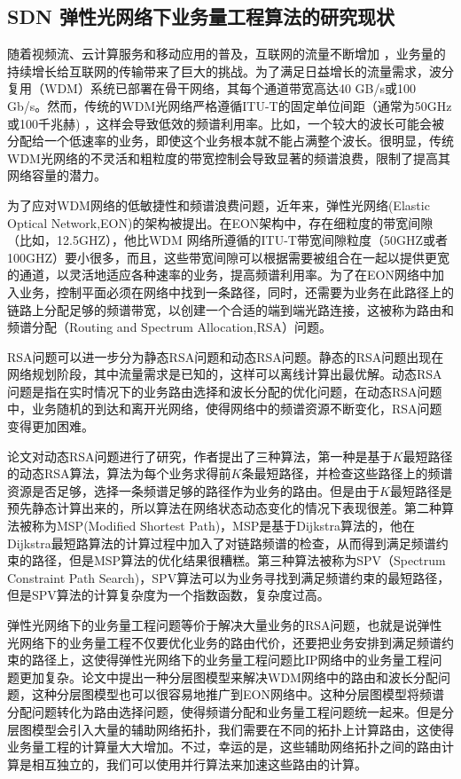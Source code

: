 \documentclass[master]{thesis-uestc}
\begin{document}
\subsection{SDN 弹性光网络下业务量工程算法的研究现状}
随着视频流、云计算服务和移动应用的普及，互联网的流量不断增加 ，业务量的持续增长给互联网的传输带来了巨大的挑战。为了满足日益增长的流量需求，波分复用（WDM）系统已部署在骨干网络，其每个通道带宽高达40 GB/s或100 Gb/s。然而，传统的WDM光网络严格遵循ITU-T的固定单位间距（通常为50GHz或100千兆赫) ，这样会导致低效的频谱利用率。比如，一个较大的波长可能会被分配给一个低速率的业务，即使这个业务根本就不能占满整个波长。很明显，传统WDM光网络的不灵活和粗粒度的带宽控制会导致显著的频谱浪费，限制了提高其网络容量的潜力。

为了应对WDM网络的低敏捷性和频谱浪费问题，近年来，弹性光网络(Elastic Optical Network,EON)的架构被提出。在EON架构中，存在细粒度的带宽间隙（比如，12.5GHZ），他比WDM 网络所遵循的ITU-T带宽间隙粒度（50GHZ或者100GHZ）要小很多，而且，这些带宽间隙可以根据需要被组合在一起以提供更宽的通道，以灵活地适应各种速率的业务，提高频谱利用率。为了在EON网络中加入业务，控制平面必须在网络中找到一条路径，同时，还需要为业务在此路径上的链路上分配足够的频谱带宽，以创建一个合适的端到端光路连接，这被称为路由和频谱分配（Routing and Spectrum Allocation,RSA）问题。

RSA问题可以进一步分为静态RSA问题和动态RSA问题。静态的RSA问题出现在网络规划阶段，其中流量需求是已知的，这样可以离线计算出最优解。动态RSA问题是指在实时情况下的业务路由选择和波长分配的优化问题，在动态RSA问题中，业务随机的到达和离开光网络，使得网络中的频谱资源不断变化，RSA问题变得更加困难。

论文对动态RSA问题进行了研究，作者提出了三种算法，第一种是基于$K$最短路径的动态RSA算法，算法为每个业务求得前$K$条最短路径，并检查这些路径上的频谱资源是否足够，选择一条频谱足够的路径作为业务的路由。但是由于$K$最短路径是预先静态计算出来的，所以算法在网络状态动态变化的情况下表现很差。第二种算法被称为MSP(Modified Shortest Path)，MSP是基于Dijkstra算法的，他在Dijkstra最短路算法的计算过程中加入了对链路频谱的检查，从而得到满足频谱约束的路径，但是MSP算法的优化结果很糟糕。第三种算法被称为SPV（Spectrum Constraint Path Search)，SPV算法可以为业务寻找到满足频谱约束的最短路径，但是SPV算法的计算复杂度为一个指数函数，复杂度过高。

弹性光网络下的业务量工程问题等价于解决大量业务的RSA问题，也就是说弹性光网络下的业务量工程不仅要优化业务的路由代价，还要把业务安排到满足频谱约束的路径上，这使得弹性光网络下的业务量工程问题比IP网络中的业务量工程问题更加复杂。论文中提出一种分层图模型来解决WDM网络中的路由和波长分配问题，这种分层图模型也可以很容易地推广到EON网络中。这种分层图模型将频谱分配问题转化为路由选择问题，使得频谱分配和业务量工程问题统一起来。但是分层图模型会引入大量的辅助网络拓扑，我们需要在不同的拓扑上计算路由，这使得业务量工程的计算量大大增加。不过，幸运的是，这些辅助网络拓扑之间的路由计算是相互独立的，我们可以使用并行算法来加速这些路由的计算。
\end{document}
